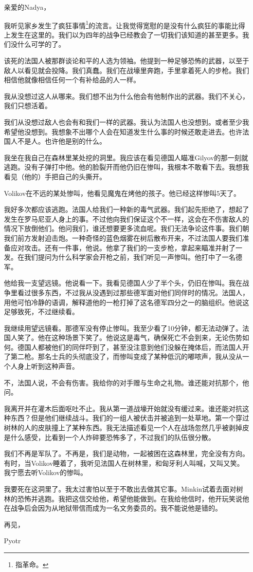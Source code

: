 \begin{scpbox}

亲爱的Nadya，

我听见家乡发生了疯狂事情\footnote{指革命。}的流言。让我觉得宽慰的是没有什么疯狂的事能比得上发生在这里的。我们以为四年的战争已经教会了一切我们该知道的甚至更多。我们没什么可学的了。

该死的法国人被那群谈论和平的人选为领袖。他提到一种足够恐怖的武器，以至于敌人以看见就会投降。我们真蠢。我们在战壕里奔跑，手里拿着死人的步枪。我们相信他就像相信任何一个有补给品的人一样。

我从没想过这人从哪来。我们想不出为什么他会有他制作出的武器。我们不关心，我们只想活着。

我们从没想过敌人也会有和我们一样的武器。我认为法国人也没想到。或者至少我希望他没想到。我想象不出哪个人会在知道发生什么事的时候还敢走进去。也许法国人不是人。也许他是别的什么。

我坐在我自己在森林里某处挖的洞里。我应该在看见德国人瞄准Gilyov的那一刻就逃跑。没有子弹打中他。他的脸裂开而他仍旧在惨叫，我根本不敢看下去。我想我看见（他的）手把自己的头撕开。

Volikov在不远的某处惨叫，他看见魔鬼在烤他的孩子。他已经这样惨叫5天了。

我好多次都应该逃跑。法国人给我们一种新的毒气武器。我们起先拒绝了，想起了发生在罗马尼亚人身上的事。不过他向我们保证这个不一样，这会在不伤害敌人的情况下放倒他们。他问我们，谁还想要更多流血呢。我们无法争论这件事。我们朝我们前方发射迫击炮。一种奇怪的蓝色烟雾在树后散布开来，不过法国人要我们准备应对攻击。还有一件事，他说。他拿了我们的一支步枪，拿起来瞄准并射了一发。在我们提问为什么科学家会开枪之前，我们听见一声惨叫。他打中了一名德军。

他给我一支望远镜。他说看一下。我看见德国人少了半个头，仍旧在惨叫。我在战争里看过很多东西，不过我从没遇到过那些德军面对他们同伴时的情况。法国人，用他可怕冷静的语调，解释道他的一枪打掉了这名德军四分之一的脑组织。他说这足够致死，不过继续看。

我继续用望远镜看。那德军没有停止惨叫。我至少看了10分钟，都无法动弹了。法国人笑了。他在这种场景下笑了。他说这是毒气，确保死亡不会到来，无论伤势如何。德国人都被他们的同伴吓到了，甚至没注意到他们没躲在掩体后，而法国人开了第二枪。那名士兵的头彻底没了，而惨叫变成了某种低沉的嘟哝声，我从没从一个人身上听到这种声音。

不，法国人说，不会有伤害。我给你的对手赠与生命之礼物。谁还能对抗那个，他问。

我离开并在灌木后面呕吐不止。我从第一道战壕开始就没有缓过来。谁还能对抗这种东西？但是他们继续战斗。我们的一组人被伏击并被追到一处草地。第一个穿过树林的人的皮肤撞上了某种东西。我无法描述看见一个人在战场忽然几乎被剥掉皮是什么感受，比看到一个人炸碎要恐怖多了，不过我们的队伍很分散。

我们不再是军队了。不再是，我们是动物，一起被困在这森林里，完全没有方向。有时，当Volikov睡着了，我听见法国人在树林里，和匈牙利人叫喊，又叫又笑。我宁愿去听Volikov的惨叫。

我要死在这洞里了。我太过害怕以至于不敢出去做其它事。Minkin试着去面对树林的恐怖并逃跑。我把这信交给他，希望他能做到。在我给他信时，他开玩笑说他在战争后会因为从地狱带信而成为一名文务委员的。我不能说他是错的。

再见，

Pyotr

\end{scpbox}
